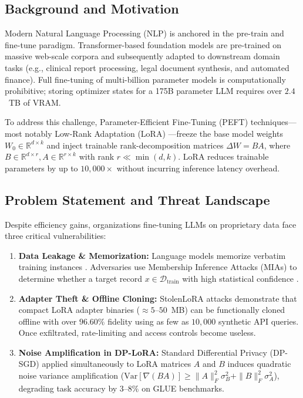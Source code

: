 \documentclass[10pt,conference,compsocconf]{IEEEtran}
\begin{document}
\subsection{Background and Motivation}
Modern Natural Language Processing (NLP) is anchored in the pre-train and fine-tune paradigm. Transformer-based foundation models are pre-trained on massive web-scale corpora and subsequently adapted to downstream domain tasks (e.g., clinical report processing, legal document synthesis, and automated finance). Full fine-tuning of multi-billion parameter models is computationally prohibitive; storing optimizer states for a 175B parameter LLM requires over $2.4$~TB of VRAM.

To address this challenge, Parameter-Efficient Fine-Tuning (PEFT) techniques---most notably Low-Rank Adaptation (LoRA) \cite{hu2022lora}---freeze the base model weights $W_0 \in \mathbb{R}^{d \times k}$ and inject trainable rank-decomposition matrices $\Delta W = B A$, where $B \in \mathbb{R}^{d \times r}, A \in \mathbb{R}^{r \times k}$ with rank $r \ll \min(d, k)$. LoRA reduces trainable parameters by up to $10,000\times$ without incurring inference latency overhead.

\subsection{Problem Statement and Threat Landscape}
Despite efficiency gains, organizations fine-tuning LLMs on proprietary data face three critical vulnerabilities:
\begin{enumerate}
    \item \textbf{Data Leakage \& Memorization:} Language models memorize verbatim training instances \cite{carlini2021extracting}. Adversaries use Membership Inference Attacks (MIAs) to determine whether a target record $x \in \mathcal{D}_{\text{train}}$ with high statistical confidence \cite{shokri2017membership}.
    \item \textbf{Adapter Theft \& Offline Cloning:} StolenLoRA attacks \cite{wang2025stolenlora} demonstrate that compact LoRA adapter binaries ($\approx 5$--$50$~MB) can be functionally cloned offline with over $96.60\%$ fidelity using as few as $10,000$ synthetic API queries. Once exfiltrated, rate-limiting and access controls become useless.
    \item \textbf{Noise Amplification in DP-LoRA:} Standard Differential Privacy (DP-SGD) \cite{abadi2016deep} applied simultaneously to LoRA matrices $A$ and $B$ induces quadratic noise variance amplification ($\text{Var}[\nabla (BA)] \ge \|A\|_F^2 \sigma_B^2 + \|B\|_F^2 \sigma_A^2$), degrading task accuracy by $3$--$8\%$ on GLUE benchmarks.
\end{enumerate}
\end{document}
